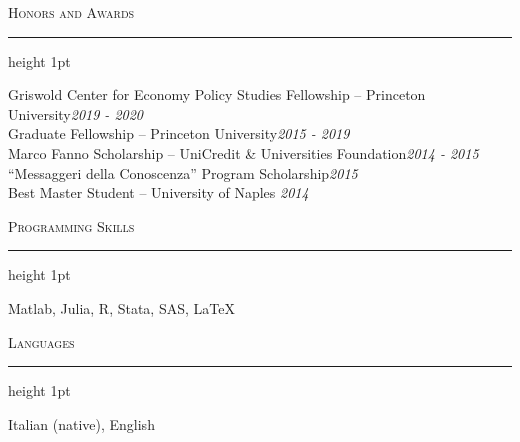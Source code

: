 \documentclass{resume} %
\renewenvironment{rSection}[1]{
\sectionskip
\Large{\textsc{#1}}
\normalsize
\sectionlineskip
\hrule height 1pt
\begin{list}{}{
\setlength{\leftmargin}{1.5em}
}
\item[]
}{
\end{list}
}
\begin{document}

\begin{rSection}{Honors and Awards} \itemsep -2pt

{Griswold Center for Economy Policy Studies Fellowship -- Princeton University}\hfill {\em 2019 - 2020} \\
{Graduate Fellowship -- Princeton University}\hfill {\em 2015 - 2019} \\
{Marco Fanno Scholarship -- UniCredit \& Universities Foundation}\hfill {\em 2014 - 2015} \\
{``Messaggeri della Conoscenza'' Program Scholarship}\hfill {\em 2015} \\
{Best Master Student -- University of Naples} \hfill {\em 2014}
\end{rSection}



\begin{rSection}{Programming Skills}

Matlab, Julia, R, Stata, SAS, \LaTeX

\end{rSection}



\begin{rSection}{Languages}

Italian (native), English

\end{rSection}
\end{document}
